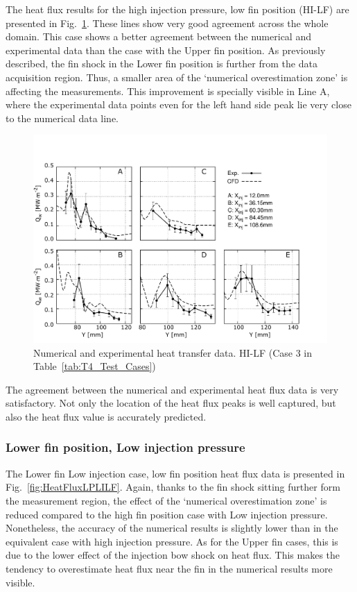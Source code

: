 \documentclass{AIAA}
\begin{document}
The heat flux results for the high injection pressure, low fin position (HI-LF) are presented in Fig.~\ref{fig:HeatFluxLPHILF}.
These lines show very good agreement across the whole domain.
This case shows a better agreement between the numerical and experimental data than the case with the Upper fin position.
As previously described, the fin shock in the Lower fin position is further from the data acquisition region.
Thus, a smaller area of the `numerical overestimation zone' is affecting the measurements. 
This improvement is specially visible in Line A, where the experimental data points even for the left hand side peak lie very close to the numerical data line.

%
\begin{figure}[!h]
\center
\includegraphics[trim = 0mm 3mm 25mm 25mm, clip, width=0.60\columnwidth,valign=t,fbox]{Figures/Data/LP_HI_LF/GNUP_CFD_GaugesLines_Multi.pdf}
\caption{Numerical and experimental heat transfer data. HI-LF (Case 3 in Table~\ref{tab:T4_Test_Cases})}
\label{fig:HeatFluxLPHILF}
\end{figure} 

The agreement between the numerical and experimental heat flux data is very satisfactory. 
Not only the location of the heat flux peaks is well captured, but also the heat flux value is accurately predicted. 

 
\subsubsection{Lower fin position, Low injection pressure}
 
The Lower fin Low injection case, low fin position heat flux data is presented in Fig.~\ref{fig:HeatFluxLPLILF}.
Again, thanks to the fin shock sitting further form the measurement region, the effect of the `numerical overestimation zone' is reduced compared to the high fin position case with Low injection pressure. 
Nonetheless, the accuracy of the numerical results is slightly lower than in the equivalent case with high injection pressure.
As for the Upper fin cases, this is due to the lower effect of the injection bow shock on heat flux.
This makes the tendency to overestimate heat flux near the fin in the numerical results more visible. 
\end{document}
